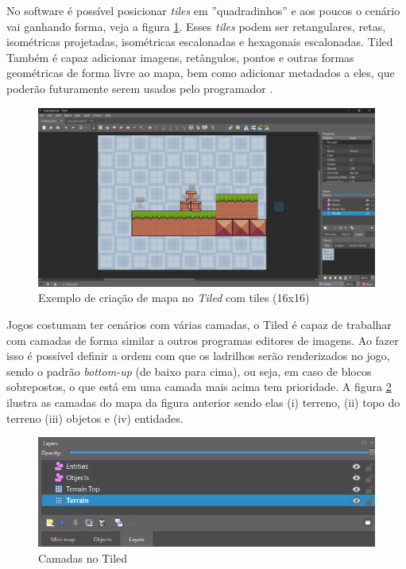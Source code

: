 No software é possível posicionar \textit{tiles} em ''quadradinhos'' e aos poucos o cenário vai ganhando forma, veja a figura \ref{fig:example-tiled}. Esses \textit{tiles} podem ser  retangulares, retas, isométricas projetadas, isométricas escalonadas e hexagonais escalonadas. Tiled Também é capaz adicionar imagens, retângulos, pontos e outras formas geométricas de forma livre ao mapa, bem como adicionar metadados a eles, que poderão futuramente serem usados pelo programador \cite{tiled}. 
\begin{figure}[h!]
    \centering
    \includegraphics[width=1\linewidth]{figuras/example-tiled.png}
    \caption{Exemplo de criação de mapa no \textit{Tiled} com tiles (16x16)}
    \label{fig:example-tiled}
\end{figure}

Jogos costumam ter cenários com várias camadas, o Tiled é capaz de trabalhar com camadas de forma similar a outros programas editores de imagens. Ao fazer isso é possível definir a ordem com que os ladrilhos serão renderizados no jogo, sendo o padrão \textit{bottom-up} (de baixo para cima), ou seja, em caso de blocos sobrepostos, o que está em uma camada mais acima tem prioridade. A figura \ref{fig:layers} ilustra as camadas do mapa da figura anterior sendo elas (i) terreno, (ii) topo do terreno (iii) objetos e (iv) entidades. 
\clearpage
\begin{figure}[h!]
    \centering
    \includegraphics[width=1\linewidth]{figuras/layers.png}
    \caption{Camadas no Tiled}
    \label{fig:layers}
\end{figure}

